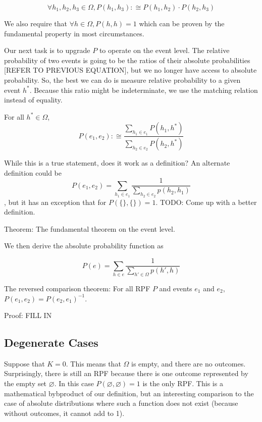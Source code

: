 \documentclass[twoside]{article}
\begin{document}
\begin{equation}
\label{eq:fundamental}
\forall h_1, h_2, h_3 \in \Omega, P(h_1, h_3) :\cong P(h_1, h_2) \cdot P(h_2, h_3)
\end{equation}

We also require that \(\forall h \in \Omega, P(h, h) = 1\) which can be proven by the fundamental property in most circumstances.

Our next task is to upgrade \(P\) to operate on the event level. The relative probability of two events is going to be the ratios of their absolute probabilities [REFER TO PREVIOUS EQUATION], but we no longer have access to absolute probability. So, the best we can do is measure relative probability to a given event \(h^*\). Because this ratio might be indeterminate, we use the matching relation instead of equality.

For all \(h^* \in \Omega\), \[P(e_1, e_2) :\cong \frac{\sum_{h_1 \in e_1} P(h_1, h^*)}{\sum_{h_2 \in e_2} P(h_2, h^*)}\]

While this is a true statement, does it work as a definition? An alternate definition could be \[P(e_1, e_2) = \sum_{h_1 \in e_1} \frac{1}{\sum_{h_2 \in e_2} p(h_2, h_1)}\], but it has an exception that for \(P(\{\},\{\}) = 1\). TODO: Come up with a better definition.

Theorem: The fundamental theorem on the event level.

We then derive the absolute probability function as

\[P(e) = \sum_{h \in e} \frac{1}{\sum_{h' \in \Omega}p(h', h)}\]

The reversed comparison theorem: For all RPF \(P\) and events \(e_1\) and \(e_2\), \(P(e_1, e_2) = P(e_2, e_1)^{-1}\).

Proof: FILL IN

\subsection{Degenerate Cases}

Suppose that \(K = 0\). This means that \(\Omega\) is empty, and there are no outcomes. Surprisingly, there is still an RPF because there is one outcome represented by the empty set \(\varnothing\). In this case \(P(\varnothing, \varnothing) = 1\) is the only RPF. This is a mathematical bybproduct of our definition, but an interesting comparison to the case of absolute distributions where such a function does not exist (because without outcomes, it cannot add to 1).
\end{document}
